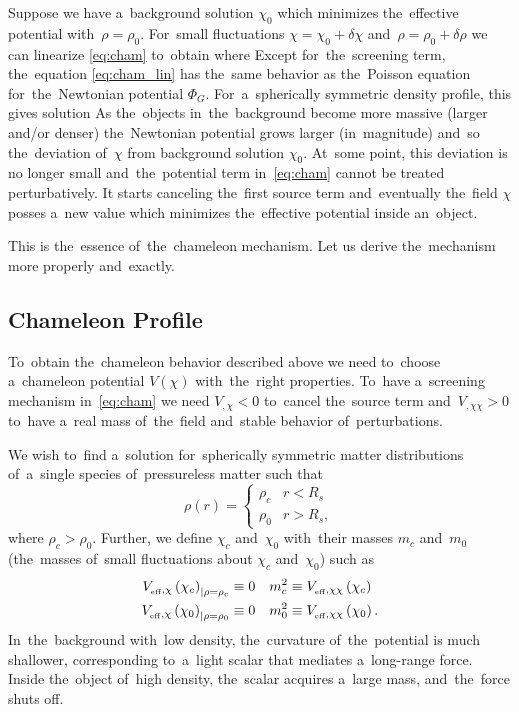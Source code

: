 Suppose we have a~background solution $\chi_0$ which minimizes the~effective potential with~$\rho=\rho_0$. For~small fluctuations $\chi=\chi_0+\delta\chi$ and~$\rho=\rho_0+\delta\rho$ we can linearize \eqref{eq:cham} to~obtain
where
Except for~the~screening term, the~equation \eqref{eq:cham_lin} has the~same behavior as the~Poisson equation for~the~Newtonian potential $\Phi_G$. For~a~spherically symmetric density profile, this gives solution
As the~objects in~the~background become more massive (larger and/or denser) the~Newtonian potential grows larger (in~magnitude) and~so the~deviation of~$\chi$ from background solution $\chi_0$. At~some point, this deviation is no longer small and~the~potential term in~\eqref{eq:cham} cannot be treated perturbatively. It starts canceling the~first source term and~eventually the~field $\chi$ posses a~new value which minimizes the~effective potential inside an~object.

This is the~essence of~the~chameleon mechanism. Let us derive the~mechanism more properly and~exactly. 
\subsection{Chameleon Profile}
\label{cham_prof}
To~obtain the~chameleon behavior described above we need to~choose a~chameleon potential $V(\chi)$ with~the~right properties. To~have a~screening mechanism in~\eqref{eq:cham} we need $V_{,\chi}<0$ to~cancel the~source term and~$V_{,\chi\chi}>0$ to~have a~real mass of~the~field and~stable behavior of~perturbations.

We wish to~find a~solution for~spherically symmetric matter distributions of~a~single species of~pressureless matter such that
\begin{equation*}
\rho(r)=
\begin{cases}
\rho_c & r<R_s \\
\rho_0 & r>R_s,
\end{cases}
\end{equation*}
where $\rho_c>\rho_0$. Further, we define $\chi_c$ and~$\chi_0$ with~their masses $m_c$ and~$m_0$ (the~masses of~small fluctuations about $\chi_c$ and~$\chi_0$) such as
\begin{align*}
V_{_\text{\tiny eff},\chi}\left(\chi_c\right)_{|\rho=\rho_c}&\equiv0	&	m^2_c&\equiv V_{_\text{\tiny eff},\chi\chi}\left(\chi_c\right) \\
V_{_\text{\tiny eff},\chi}\left(\chi_0\right)_{|\rho=\rho_0}&\equiv0	&	m^2_0&\equiv V_{_\text{\tiny eff},\chi\chi}\left(\chi_0\right).
\end{align*}
In~the~background with~low density, the~curvature of~the~potential is much shallower, corresponding to~a~light scalar that mediates a~long-range force. Inside the~object of~high density, the~scalar acquires a~large mass, and~the~force shuts off.

